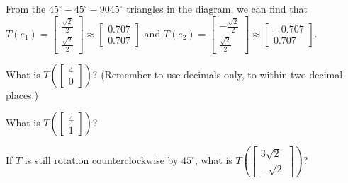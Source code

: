 From the $45^\circ-45^\circ-9045^\circ$ triangles in the diagram, we can find that  
$T(e_1) = \left[ \begin{array}{c} \frac{\sqrt{2}}{2} \\ \frac{\sqrt{2}}{2}  \end{array} \right] \approx
\left[ \begin{array}{c} 0.707 \\ 0.707 \end{array} \right]$ and
$T(e_2) = \left[ \begin{array}{c} -\frac{\sqrt{2}}{2} \\ \frac{\sqrt{2}}{2}  \end{array} \right] \approx
\left[ \begin{array}{c} -0.707 \\ 0.707  \end{array} \right].$   

What is $T\left( \left[ \begin{array}{c} 4 \\ 0 \end{array} \right] \right)$?  (Remember to use decimals only, to within two decimal places.)  





\edXsolution{ 

}


\endedxproblem



What is $T\left( \left[ \begin{array}{c} 4 \\ 1 \end{array} \right] \right)$?  





\edXsolution{ 

}


\endedxproblem





If $T$ is still rotation counterclockwise by $45^\circ$, 
what is $T\left( \left[ \begin{array}{c} 3\sqrt{2} \\ -\sqrt{2} \end{array} \right] \right)$?  

